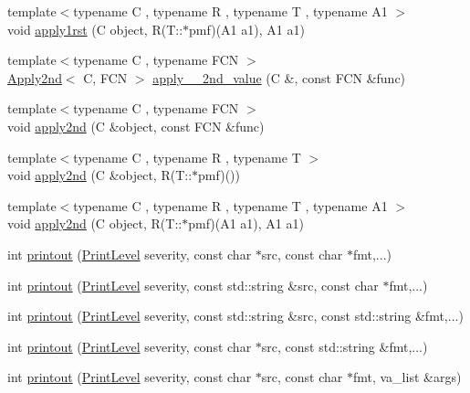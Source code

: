 \begin{DoxyCompactItemize}
\item 
{\footnotesize template$<$typename C , typename R , typename T , typename A1 $>$ }\\void \hyperlink{namespace_d_d4hep_a05ec64b906bbf71787bb54a37443bd61}{apply1rst} (C object, R(T\+::$\ast$pmf)(A1 a1), A1 a1)
\item 
{\footnotesize template$<$typename C , typename F\+CN $>$ }\\\hyperlink{class_d_d4hep_1_1_apply2nd}{Apply2nd}$<$ C, F\+CN $>$ \hyperlink{namespace_d_d4hep_afc7d2a60cdb6a3cbc5ef50ae3dc515e3}{apply\+\_\+\+\_\+2nd\+\_\+value} (C \&, const F\+CN \&func)
\item 
{\footnotesize template$<$typename C , typename F\+CN $>$ }\\void \hyperlink{namespace_d_d4hep_a4137ce26160b52fbd421be1f6b3fdd3a}{apply2nd} (C \&object, const F\+CN \&func)
\item 
{\footnotesize template$<$typename C , typename R , typename T $>$ }\\void \hyperlink{namespace_d_d4hep_a2e08c4f02331450925ff16a4fd902f6e}{apply2nd} (C \&object, R(T\+::$\ast$pmf)())
\item 
{\footnotesize template$<$typename C , typename R , typename T , typename A1 $>$ }\\void \hyperlink{namespace_d_d4hep_ad8ba7e02c7d191ebeefb36f2a9278bbb}{apply2nd} (C object, R(T\+::$\ast$pmf)(A1 a1), A1 a1)
\item 
int \hyperlink{namespace_d_d4hep_a6d434af620a49074f3d86d05a04b6073}{printout} (\hyperlink{namespace_d_d4hep_a5b5a64d56252469451f2020a27d57d42}{Print\+Level} severity, const char $\ast$src, const char $\ast$fmt,...)
\item 
int \hyperlink{namespace_d_d4hep_a56158e35364c45902f21968cd334c53f}{printout} (\hyperlink{namespace_d_d4hep_a5b5a64d56252469451f2020a27d57d42}{Print\+Level} severity, const std\+::string \&src, const char $\ast$fmt,...)
\item 
int \hyperlink{namespace_d_d4hep_a335f9a94367d028c2719a77bfccfb2d2}{printout} (\hyperlink{namespace_d_d4hep_a5b5a64d56252469451f2020a27d57d42}{Print\+Level} severity, const std\+::string \&src, const std\+::string \&fmt,...)
\item 
int \hyperlink{namespace_d_d4hep_a40471a3209c63eb0f25dcad8c5f0e3d6}{printout} (\hyperlink{namespace_d_d4hep_a5b5a64d56252469451f2020a27d57d42}{Print\+Level} severity, const char $\ast$src, const std\+::string \&fmt,...)
\item 
int \hyperlink{namespace_d_d4hep_ad4be91cbf746f4c9fc6f175c371c14c3}{printout} (\hyperlink{namespace_d_d4hep_a5b5a64d56252469451f2020a27d57d42}{Print\+Level} severity, const char $\ast$src, const char $\ast$fmt, va\+\_\+list \&args)

\end{DoxyCompactItemize}
